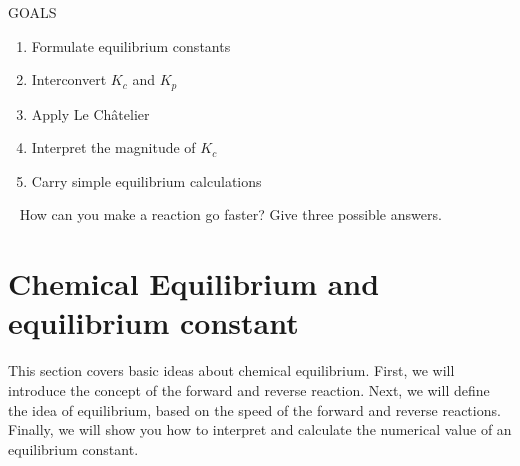 \documentclass[main.tex]{subfiles}
\begin{document}
\begin{marginfigure}%
\begin{mytcbox}{GOALS}
\begin{enumerate}[label=\protect\circled{\color{white}\arabic*}]
\item Formulate equilibrium constants
\item Interconvert $K_c$ and $K_p$
\item Apply Le Ch\^{a}telier
\item Interpret the magnitude of $K_c$
\item Carry simple equilibrium calculations
\end{enumerate}
\end{mytcbox}
\vspace{1cm}
\begin{tcolorbox}[enhanced,colback=red!5!white,colframe=black!50!red,boxrule=1pt,
  arc=0pt,outer arc=0pt,drop heavy lifted shadow]
\faGears\ 
 How can you make a reaction go faster? Give three possible answers. \end{tcolorbox}
\end{marginfigure}%

\section{Chemical Equilibrium and equilibrium constant}
This section covers basic ideas about chemical equilibrium. 
First, we will introduce the concept of the forward and reverse reaction. Next, we will define the idea of equilibrium, based on the speed of the forward and reverse reactions. Finally, we will show you how to interpret and calculate the numerical value of an equilibrium constant.

\sloppy
\end{document}
